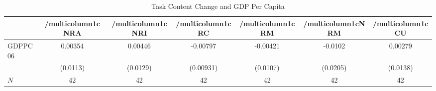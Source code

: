 \begin{table}[htbp]\centering
\def\sym#1{\ifmmode^{#1}\else\(^{#1}\)\fi}
\caption{Task Content Change and GDP Per Capita}
\begin{tabular}{l*{6}{c}}
\hline\hline
            &/multicolumn{1}{c}{NRA}&/multicolumn{1}{c}{NRI}&/multicolumn{1}{c}{RC}&/multicolumn{1}{c}{RM}&/multicolumn{1}{c}{NRM}&/multicolumn{1}{c}{CU}\\
\hline
GDPPC06     &     0.00354         &     0.00446         &    -0.00797         &    -0.00421         &     -0.0102         &     0.00279         \\
            &    (0.0113)         &    (0.0129)         &   (0.00931)         &    (0.0107)         &    (0.0205)         &    (0.0138)         \\
\hline
\(N\)       &          42         &          42         &          42         &          42         &          42         &          42         \\
\hline\hline
\end{tabular}
\end{table}
